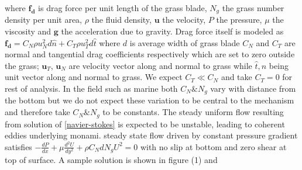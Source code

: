 \documentclass[aps,twocolumn,floatfix,prl,10pt]{revtex4-1}
\newcommand{\bu}{\mathbf{u}}
\newcommand{\del}{\partial}
\begin{document}
where $\mathbf{f_{d}}$ is drag force per unit length of the grass blade, $N_g$ the grass number density per unit area, $\rho$ the fluid density, $\mathbf{u}$ the velocity, 
$P$ the pressure, $\mu$ the viscosity and $\mathbf{g}$ the acceleration due to gravity. Drag force itself is modeled 
as $\mathbf{f_{d}}=C_N \rho u_{N}^{2}d\hat{n}+C_{T}\rho u_{T}^{2}d\hat{t}$ where $d$ is average width of grass blade
$C_{N}$ and $C_{T}$ are normal and tangential drag coefficients respectively which are set to zero outside the grass; $\bu_{T}$, $\bu_{N}$ are velocity vector along and
normal to grass while $\hat{t},\hat{n}$ being unit vector along and normal to grass. We expect $C_T \ll C_N$ and take $C_T=0$ for rest of analysis. In the field such as marine
both $C_N \& N_g$ vary with distance from the bottom but we do not expect these variation to be central to the mechanism and therefore take $C_N \& N_g$ to be constants.
\newline
The steady uniform flow resulting from solution of \eqref{navier-stokes} is expected to be unstable, leading to coherent eddies underlying monami. steady state flow driven by   
constant pressure gradient satisfies
$-\frac{dP}{dx}+\mu\frac{d^2U}{dy^2}+\rho C_N d N_gU^2=0$ with no slip at bottom and zero shear at top of surface. A sample solution is shown in figure (1) and 
\end{document}
